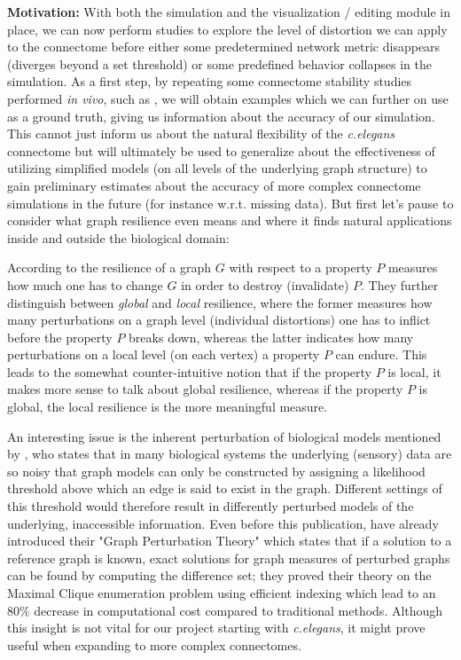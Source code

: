 \documentclass[a4paper,11pt]{article}
\begin{document}
\textbf{Motivation:}
With both the simulation and the visualization / editing module in place, we can now perform studies to explore the level of distortion we can apply to the connectome before either some predetermined network metric disappears (diverges beyond a set threshold) or some predefined behavior collapses in the simulation. As a first step, by repeating some connectome stability studies performed \emph{in vivo}, such as \citep{Avery1989473}, we will obtain examples which we can further on use as a ground truth, giving us information about the accuracy of our simulation. This cannot just inform us about the natural flexibility of the \emph{c.elegans} connectome but will ultimately be used to generalize about the effectiveness of utilizing simplified models (on all levels of the underlying graph structure) to gain preliminary estimates about the accuracy of more complex connectome simulations in the future (for instance w.r.t. missing data). But first let's pause to consider what graph resilience even means and where it finds natural applications inside and outside the biological domain:

According to \citep{Sudakov2008LocalGlobal} the resilience of a graph $G$ with respect to a property $P$ measures how much one has to change $G$ in order to destroy (invalidate) $P$. They further distinguish between \textit{global} and \textit{local} resilience, where the former measures how many perturbations on a graph level (individual distortions) one has to inflict before the property $P$ breaks down, whereas the latter indicates how many perturbations on a local level (on each vertex) a property $P$ can endure. This leads to the somewhat counter-intuitive notion that if the property $P$ is local, it makes more sense to talk about global resilience, whereas if the property $P$ is global, the local resilience is the more meaningful measure.

An interesting issue is the inherent perturbation of biological models mentioned by \citep{Hendrix2010MaxCliqueTheory}, who states that in many biological systems the underlying (sensory) data are so noisy that graph models can only be constructed by assigning a likelihood threshold above which an edge is said to exist in the graph. Different settings of this threshold would therefore result in differently perturbed models of the underlying, inaccessible information. Even before this publication, \citep{Samatova2008GraphPerturbationScalableAlgorithms} have already introduced their "Graph Perturbation Theory" which states that if a solution to a reference graph is known, exact solutions for graph measures of perturbed graphs can be found by computing the difference set; they proved their theory on the Maximal Clique enumeration problem using efficient indexing which lead to an 80\% decrease in computational cost compared to traditional methods. Although this insight is not vital for our project starting with \emph{c.elegans}, it might prove useful when expanding to more complex connectomes.
\\[0,2cm]
\end{document}
